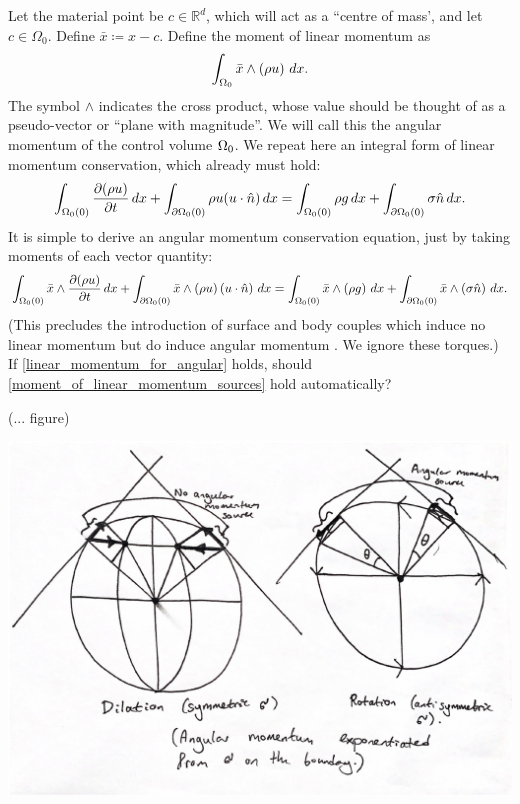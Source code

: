 Let the material point be $c \in \mathbb{R}^d$, which will act as a ``centre of mass', and let $c \in \Omega_0$.
Define $\bar{x} \coloneqq x - c$.
Define the moment of linear momentum as
\begin{equation}\label{moment_of_linear_momentum}
    \int_{{\Omega_0}} \bar{x} \wedge \left(\rho u\right)\,dx.
\end{equation}
The symbol $\wedge$ indicates the cross product, whose value should be thought of as a pseudo-vector or ``plane with magnitude''.
We will call this the angular momentum of the control volume ${\Omega_0}$.
We repeat here an integral form of linear momentum conservation, which already must hold:
\begin{equation}\label{linear_momentum_for_angular}
    \int_{{\Omega_0}(0)} \frac{\partial (\rho u)}{\partial t}\,dx + \int_{{\partial\Omega_0}(0)} \rho u (u\cdot \hat{n})\,dx
    = \int_{{\Omega_0}(0)} \rho g\,dx + \int_{{\partial\Omega_0}(0)} \sigma \hat{n}\,dx.
\end{equation}
It is simple to derive an angular momentum conservation equation, just by taking moments of each vector quantity:
\begin{equation}\label{moment_of_linear_momentum_sources}
    \int_{{\Omega_0}(0)} \bar{x} \wedge \frac{\partial (\rho u)}{\partial t}\,dx + \int_{{\partial\Omega_0}(0)} \bar{x} \wedge \left(\rho u\right)\left(u\cdot \hat{n}\right)\,dx
    = \int_{{\Omega_0}(0)} \bar{x} \wedge \left(\rho g\right)\,dx + \int_{{\partial\Omega_0}(0)} \bar{x} \wedge \left(\sigma \hat{n}\right)\,dx.
\end{equation}
(This precludes the introduction of surface and body couples which induce no linear momentum but do induce angular momentum
\cite{leal}. We ignore these torques.)
\\
If \eqref{linear_momentum_for_angular} holds, should \eqref{moment_of_linear_momentum_sources} hold automatically?

(... figure)
\begin{center}
\includegraphics[page=1,width=0.7\linewidth]{figures/3.pdf}
\end{center}


